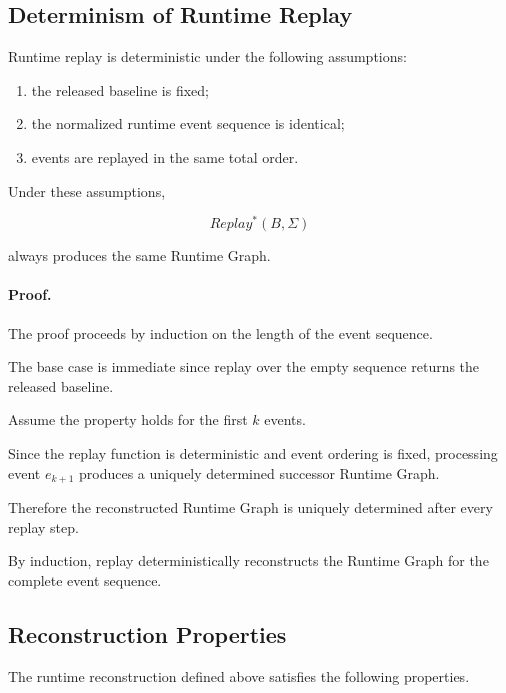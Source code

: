 \documentclass[10pt]{article}
\begin{document}
	\subsection{Determinism of Runtime Replay}
	\label{appendix:runtime_determinism}
	
	Runtime replay is deterministic under the following assumptions:
	
	\begin{enumerate}
		\item the released baseline is fixed;
		\item the normalized runtime event sequence is identical;
		\item events are replayed in the same total order.
	\end{enumerate}
	
	Under these assumptions,
	
	\[
	Replay^*(B,\Sigma)
	\]
	
	always produces the same Runtime Graph.
	
	\paragraph*{Proof.}
	
	The proof proceeds by induction on the length of the event sequence.
	
	The base case is immediate since replay over the empty sequence returns the
	released baseline.
	
	Assume the property holds for the first $k$ events.
	
	Since the replay function is deterministic and event ordering is fixed,
	processing event $e_{k+1}$ produces a uniquely determined successor Runtime
	Graph.
	
	Therefore the reconstructed Runtime Graph is uniquely determined after every
	replay step.
	
	By induction, replay deterministically reconstructs the Runtime Graph for the
	complete event sequence.
	
	\subsection{Reconstruction Properties}
	\label{appendix:runtime_properties}
	
	The runtime reconstruction defined above satisfies the following properties.
	
\end{document}
